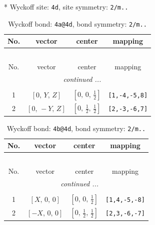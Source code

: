 \documentclass[fleqn,8pt]{jsarticle}
\begin{document}
* Wyckoff site: {\tt 4d}, site symmetry: {\tt 2/m..}
\renewcommand{\arraystretch}{1.2}
\begin{longtable}{cccc}
\caption{Wyckoff bond: {\tt 4a@4d}, bond symmetry: {\tt 2/m..}}
 \\
 \hline \hline
No. & vector & center & mapping \\ \hline \endfirsthead

\multicolumn{3}{l}{\tablename\ \thetable{}} \\
 \hline \hline
No. & vector & center & mapping \\ \hline \endhead

 \hline \hline
\multicolumn{3}{r}{\footnotesize\it continued ...} \\ \endfoot

 \hline \hline
\multicolumn{3}{r}{} \\ \endlastfoot

1 & $\left[ 0,\, Y,\, Z \right]$ & $\left[ 0,\, 0,\, \frac{1}{2} \right]$ & {\tt [1,-4,-5,8]} \\ \hline
2 & $\left[ 0,\, - Y,\, Z \right]$ & $\left[ 0,\, \frac{1}{2},\, \frac{1}{2} \right]$ & {\tt [2,-3,-6,7]} \\
\end{longtable}
\renewcommand{\arraystretch}{1.2}
\begin{longtable}{cccc}
\caption{Wyckoff bond: {\tt 4b@4d}, bond symmetry: {\tt 2/m..}}
 \\
 \hline \hline
No. & vector & center & mapping \\ \hline \endfirsthead

\multicolumn{3}{l}{\tablename\ \thetable{}} \\
 \hline \hline
No. & vector & center & mapping \\ \hline \endhead

 \hline \hline
\multicolumn{3}{r}{\footnotesize\it continued ...} \\ \endfoot

 \hline \hline
\multicolumn{3}{r}{} \\ \endlastfoot

1 & $\left[ X,\, 0,\, 0 \right]$ & $\left[ 0,\, 0,\, \frac{1}{2} \right]$ & {\tt [1,4,-5,-8]} \\ \hline
2 & $\left[ - X,\, 0,\, 0 \right]$ & $\left[ 0,\, \frac{1}{2},\, \frac{1}{2} \right]$ & {\tt [2,3,-6,-7]} \\
\end{longtable}
\renewcommand{\arraystretch}{1.2}
\end{document}
